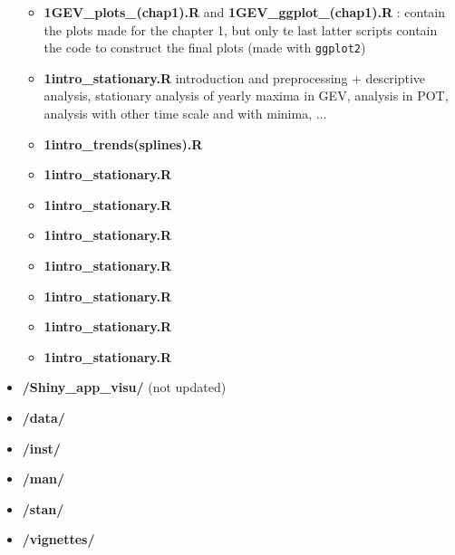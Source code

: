 \begin{itemize}
\begin{itemize}
\item \textbf{1GEV\_plots\_(chap1).R} and \textbf{1GEV\_ggplot\_(chap1).R} : contain the plots made for the chapter 1, but only te last latter scripts contain the code to construct the final plots (made with \texttt{ggplot2})
\item\textbf{1intro\_stationary.R} introduction and preprocessing +  descriptive analysis, stationary analysis of yearly maxima in GEV, analysis in POT, analysis with other time scale and with minima, ...
\item\textbf{1intro\_trends(splines).R} 
\item\textbf{1intro\_stationary.R} 
\item\textbf{1intro\_stationary.R} 
\item\textbf{1intro\_stationary.R} 
\item\textbf{1intro\_stationary.R} 
\item\textbf{1intro\_stationary.R} 
\item\textbf{1intro\_stationary.R} 
\item\textbf{1intro\_stationary.R} 
\end{itemize}


\item \textbf{/Shiny\_app\_visu/} (not updated)
\item \textbf{/data/}
\item \textbf{/inst/}
\item \textbf{/man/}
\item \textbf{/stan/}
\item \textbf{/vignettes/}
\end{itemize}

